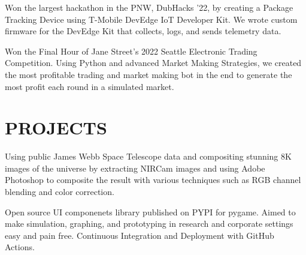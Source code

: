 \documentclass[]{main}
\begin{document}
\begin{minipage}[t]{0.66\textwidth}
Won the largest hackathon in the PNW, DubHacks '22, by creating a Package Tracking Device using T-Mobile DevEdge IoT Developer Kit. We wrote custom firmware for the DevEdge Kit that collects, logs, and sends telemetry data.
\sectionsep

Won the Final Hour of Jane Street's 2022 Seattle Electronic Trading Competition. Using Python and advanced Market Making Strategies, we created the most profitable trading and market making bot in the end to generate the most profit each round in a simulated market.
\sectionsep



\section{PROJECTS}

Using public James Webb Space Telescope data and compositing stunning 8K images of the universe by extracting NIRCam images and using Adobe Photoshop to composite the result with various techniques such as RGB channel blending and color correction.

\sectionsep

Open source UI componenets library published on PYPI for pygame. Aimed to make simulation, graphing, and prototyping in research and corporate settings easy and pain free. Continuous Integration and Deployment with GitHub Actions. 
\sectionsep

\end{minipage} 
\end{document}
